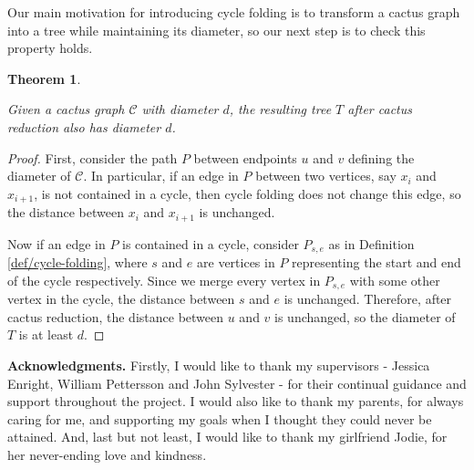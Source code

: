 \documentclass{mpaper}
\newtheorem{theorem}{Theorem}[section]
\begin{document}
Our main motivation for introducing cycle folding is to transform a cactus graph into a tree while maintaining its diameter, so our next step is to check this property holds.

\begin{theorem}
  \label{thm/cactus-reduction-diameter}

  Given a cactus graph $\mathcal{C}$ with diameter $d$, the resulting tree $T$ after cactus reduction also has diameter $d$.
\end{theorem}

\begin{proof}
  
  First, consider the path $P$ between endpoints $u$ and $v$ defining the diameter of $\mathcal{C}$. In particular, if an edge in $P$ between two vertices, say $x_i$ and $x_{i+1}$, is not contained in a cycle, then cycle folding does not change this edge, so the distance between $x_i$ and $x_{i+1}$ is unchanged.

  Now if an edge in $P$ is contained in a cycle, consider $P_{s,e}$ as in Definition \ref{def/cycle-folding}, where $s$ and $e$ are vertices in $P$ representing the start and end of the cycle respectively. Since we merge every vertex in $P_{s,e}$ with some other vertex in the cycle, the distance between $s$ and $e$ is unchanged. Therefore, after cactus reduction, the distance between $u$ and $v$ is unchanged, so the diameter of $T$ is at least $d$.
\end{proof}

{\bf Acknowledgments.}
Firstly, I would like to thank my supervisors - Jessica Enright, William Pettersson and John Sylvester - for their continual guidance and support throughout the project. I would also like to thank my parents, for always caring for me, and supporting my goals when I thought they could never be attained. And, last but not least, I would like to thank my girlfriend Jodie, for her never-ending love and kindness.



\end{document}
